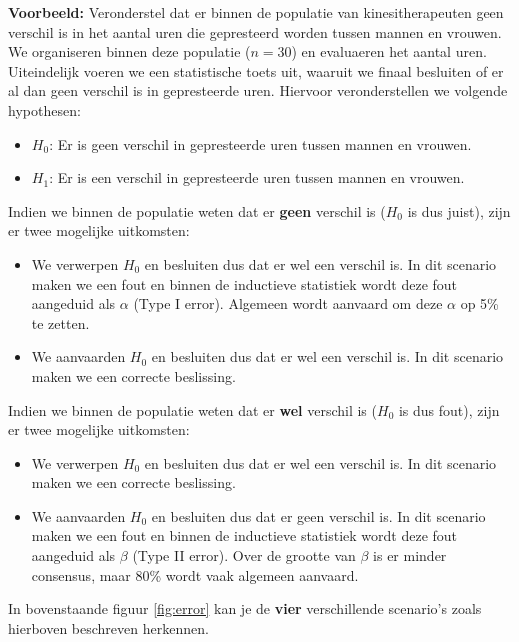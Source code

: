 \documentclass[
]{book}
\providecommand{\tightlist}{%
  \setlength{\itemsep}{0pt}\setlength{\parskip}{0pt}}
\theoremstyle{definition}
\theoremstyle{definition}
\theoremstyle{definition}
\theoremstyle{definition}
\theoremstyle{remark}
\begin{document}
\textbf{Voorbeeld:} Veronderstel dat er binnen de populatie van kinesitherapeuten geen verschil is in het aantal uren die gepresteerd worden tussen mannen en vrouwen. We organiseren binnen deze populatie (\(n = 30\)) en evaluaeren het aantal uren. Uiteindelijk voeren we een statistische toets uit, waaruit we finaal besluiten of er al dan geen verschil is in gepresteerde uren. Hiervoor veronderstellen we volgende hypothesen:

\begin{itemize}
\tightlist
\item
  \(H_0\): Er is geen verschil in gepresteerde uren tussen mannen en vrouwen.
\item
  \(H_1\): Er is een verschil in gepresteerde uren tussen mannen en vrouwen.
\end{itemize}

Indien we binnen de populatie weten dat er \textbf{geen} verschil is (\(H_0\) is dus juist), zijn er twee mogelijke uitkomsten:

\begin{itemize}
\tightlist
\item
  We verwerpen \(H_0\) en besluiten dus dat er wel een verschil is. In dit scenario maken we een fout en binnen de inductieve statistiek wordt deze fout aangeduid als \(\alpha\) (Type I error). Algemeen wordt aanvaard om deze \(\alpha\) op 5\% te zetten.
\item
  We aanvaarden \(H_0\) en besluiten dus dat er wel een verschil is. In dit scenario maken we een correcte beslissing.
\end{itemize}

Indien we binnen de populatie weten dat er \textbf{wel} verschil is (\(H_0\) is dus fout), zijn er twee mogelijke uitkomsten:

\begin{itemize}
\tightlist
\item
  We verwerpen \(H_0\) en besluiten dus dat er wel een verschil is. In dit scenario maken we een correcte beslissing.
\item
  We aanvaarden \(H_0\) en besluiten dus dat er geen verschil is. In dit scenario maken we een fout en binnen de inductieve statistiek wordt deze fout aangeduid als \(\beta\) (Type II error). Over de grootte van \(\beta\) is er minder consensus, maar 80\% wordt vaak algemeen aanvaard.
\end{itemize}

In bovenstaande figuur \ref{fig:error} kan je de \textbf{vier} verschillende scenario's zoals hierboven beschreven herkennen.
\end{document}
